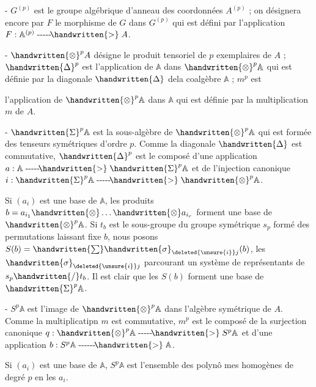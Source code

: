 \noindent - $G^{(p)}$ est le groupe algébrique d'anneau des coordonnées $A^{(p)}$ ; on désignera encore par $F$ le morphisme de $G$ dans $G^{(p)}$ qui est défini par l'application $F:\mathbb{A}^{(p)}\mathrel{\text{-{}-{}-{}-{}-}\!\handwritten{>}}A$.

\noindent - $\handwritten{\otimes}^{p}A$ désigne le produit tensoriel de $p$ exemplaires de $A$ ; $\handwritten{\Delta}^{p}$ est l'application de $\mathbb{A}$ dans $\handwritten{\otimes}^{p}\mathbb{A}$ qui est définie par la diagonale $\handwritten{\Delta}$ dela coalgèbre $\mathbb{A}$ ; $m^p$ est

l'application de $\handwritten{\otimes}^{p}\mathbb{A}$ dans $\mathbb{A}$ qui est définie par la multiplication $m$ de $A$.

\noindent - $\handwritten{\Sigma}^{p}\mathbb{A}$ est la sous-algèbre de $\handwritten{\otimes}^{p}\mathbb{A}$ qui est formée des tenseurs symétriques d'ordre $p$. Comme la diagonale $\handwritten{\Delta}$ est commutative, $\handwritten{\Delta}^{p}$ est le composé d'une application $a:\mathbb{A}\mathrel{\text{-{}-{}-{}-{}-}\!\handwritten{>}}\handwritten{\Sigma}^{p}\mathbb{A}$ et de l'injection canonique $i:\handwritten{\Sigma}^{p}\mathbb{A}\mathrel{\text{-{}-{}-{}-{}-}\!\handwritten{>}}\handwritten{\otimes}^{p}\mathbb{A}$.

Si $(a_i)$ est une base de $\mathbb{A}$, les produits $b=a_{i_1}\handwritten{\otimes}\ldots\handwritten{\otimes}a_{i_r}$ forment une base de $\handwritten{\otimes}^{p}\mathbb{A}$. Si $t_b$ est le sous-groupe du groupe symétrique $s_p$ formé des permutations laissant fixe $b$, nous posons $S(b)=\handwritten{\sum}\handwritten{\sigma}_{\deleted{\unsure{i}}j}(b)$, les $\handwritten{\sigma}_{\deleted{\unsure{i}}j}$ parcourant un système de représentants de $s_p\handwritten{/}t_b$. Il est clair que les $S(b)$ forment une base de $\handwritten{\Sigma}^{p}\mathbb{A}$.

\noindent - $S^{p}\mathbb{A}$ est l'image de $\handwritten{\otimes}^{p}\mathbb{A}$ dans l'algèbre symétrique de $A$. Comme la multiplicatipn $m$ est commutative, $m^p$ est le composé de la surjection canonique $q:\handwritten{\otimes}^{p}\mathbb{A}\mathrel{\text{-{}-{}-{}-{}-}\!\handwritten{>}}S^p\mathbb{A}$ et d'une application $b:S^p\mathbb{A}\mathrel{\text{-{}-{}-{}-{}-{}-}\!\handwritten{>}}\mathbb{A}$.

Si $(a_i)$ est une base de $\mathbb{A}$, $S^p\mathbb{A}$ est l'ensemble des polynô mes homogènes de degré $p$ en les $a_i$.

